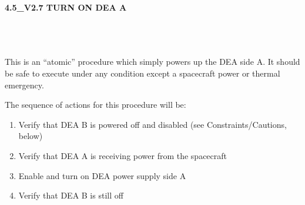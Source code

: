 \documentclass[11pt]{article}
\begin{document}
%
%
%
\newcommand{\be}{\begin{enumerate}}
\newcommand{\ee}{\end{enumerate}}
\newcommand{\bc}{\begin{center}}
\newcommand{\ec}{\end{center}}
\newcommand{\bi}{\begin{itemize}}
\newcommand{\ei}{\end{itemize}}
\newcommand{\bd}{\begin{description}}
\newcommand{\ed}{\end{description}}
\newcommand{\bt}{\begin{tabbing}}
\newcommand{\et}{\end{tabbing}}
\newcommand{\eg}{{\it e.g.~}}
\newcommand{\ie}{{\it i.e.~}}
\newcommand{\ul}{\underline}
\newcommand{\axaf}{{\em AXAF}}

\def\la{\hbox{\rlap{$<$}\lower0.5ex\hbox{$\sim$}\ }}

\large
\centerline {\bf 4.5\_V2.7 TURN ON DEA A}
\vspace{0.25in}

\normalsize
{}\\
 \\


 \\
\normalsize
This is an ``atomic'' procedure which simply powers up the DEA side A.
It should be safe to execute under any condition except a spacecraft 
power or thermal emergency.

\vspace{0.25in}
\noindent The sequence of actions for this procedure will be:
\be
\item Verify that DEA B is powered off and disabled (see Constraints/Cautions, below)
\vspace{-0.10in}
\item Verify that DEA A is receiving power from the spacecraft
\vspace{-0.10in}
\item Enable and turn on DEA power supply side A
\vspace{-0.10in}
\item Verify that DEA B is still off
\ee
\end{document}
